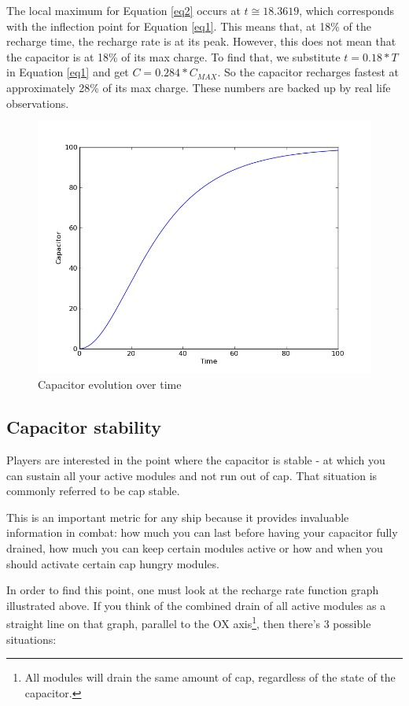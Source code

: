 The local maximum for Equation \ref{eq2} occurs at $ t \cong 18.3619 $, which corresponds with the inflection point for Equation \ref{eq1}. This means that, at 18\% of the recharge time, the recharge rate is at its peak. However, this does not mean that the capacitor is at 18\% of its max charge. To find that, we substitute $ t = 0.18 * T $ in Equation \ref{eq1} and get $ C = 0.284 * C_{MAX} $. So the capacitor recharges fastest at approximately 28\% of its max charge. These numbers are backed up by real life observations.

\begin{figure}[h]
\centering
\includegraphics[width=0.7\linewidth]{src/img/capvstime}
\caption{Capacitor evolution over time}
\label{fig:capvstime}
\end{figure}


\subsection{Capacitor stability}
Players are interested in the point where the capacitor is stable - at which you can sustain all your active modules and not run out of cap. That situation is commonly referred to be cap stable.

This is an important metric for any ship because it provides invaluable information in combat: how much you can last before having your capacitor fully drained, how much you can keep certain modules active or how and when you should activate certain cap hungry modules.

In order to find this point, one must look at the recharge rate function graph illustrated above. If you think of the combined drain of all active modules as a straight line on that graph, parallel to the OX axis\footnote{All modules will drain the same amount of cap, regardless of the state of the capacitor.}, then there’s 3 possible situations:

